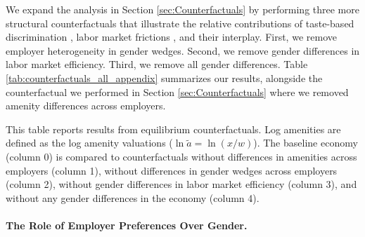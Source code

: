 We expand the analysis in Section \ref{sec:Counterfactuals} by performing three more structural counterfactuals that illustrate the relative contributions of taste-based discrimination \citep{becker1971}, labor market frictions \citep{Manning2003}, and their interplay. First, we remove employer heterogeneity in gender wedges. Second, we remove gender differences in labor market efficiency. Third, we remove all gender differences. Table \ref{tab:counterfactuals_all_appendix} summarizes our results, alongside the counterfactual we performed in Section \ref{sec:Counterfactuals} where we removed amenity differences across employers.
%
\begin{table}[htbp!]
    \caption{Structural decomposition of the gender pay gap}
    \label{tab:counterfactuals_all_appendix}
    \resizebox{\textwidth}{!}{%
    
    }
    \begin{tablenotes}
        \footnotesize
        This table reports results from equilibrium counterfactuals. Log amenities are defined as the log amenity valuations ($\ln \tilde{a} = \ln(x/w)$). The baseline economy (column 0) is compared to counterfactuals without differences in amenities across employers (column 1), without differences in gender wedges across employers (column 2), without gender differences in labor market efficiency (column 3), and without any gender differences in the economy (column 4). %
    \end{tablenotes}
    \begin{tablenotes}[Source]
        \sourcemodel%
    \end{tablenotes}
\end{table}
%


\paragraph{The Role of Employer Preferences Over Gender.}

